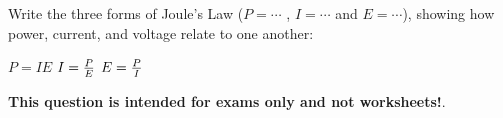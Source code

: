 

Write the three forms of Joule's Law ($P = \cdots$ \hskip 10pt , $I = \cdots$ \hskip 10pt and $E = \cdots$), showing how power, current, and voltage relate to one another:







$P = IE$ \hskip 30pt $I = {P \over E}$ \hskip 30pt $E = {P \over I}$







{\bf This question is intended for exams only and not worksheets!}.



